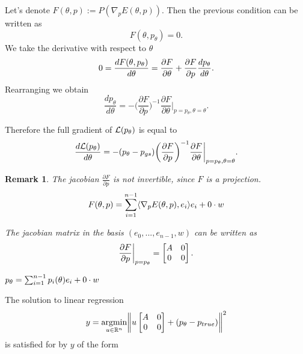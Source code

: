 \documentclass[a4paper,10pt]{report}
\newtheorem{remark}{Remark}
\begin{document}
Let's denote $F(\theta,p) :=P (\nabla_p E(\theta,p)).$ Then the previous condition can be written as
\begin{equation}
 F(\theta,p_\theta) = 0.
\end{equation}
We take the derivative with respect to $\theta$
\begin{equation}
0=\frac{dF(\theta, p_\theta)}{d \theta} = \frac{\partial F}{\partial \theta} + \frac{\partial F}{\partial p} \frac{dp_\theta}{d \theta}.
\end{equation}
Rearranging we obtain
\begin{equation}
 \frac{d p_\theta}{d\theta} = - \bigg(\frac{\partial F}{\partial p}\bigg)^{-1}  \frac{\partial F}{\partial \theta}\bigg|_{p=p_\theta, \theta=\theta}.
\end{equation}

Therefore the full gradient of $\mathcal{L}(p_\theta)$ is equal to
\begin{equation}
 \frac{d\mathcal{L}(p_\theta)}{d \theta} = - (p_\theta - p_{gs})\bigg(\frac{\partial F}{\partial p}\bigg)^{-1}  \frac{\partial F}{\partial \theta}\bigg|_{p=p_\theta, \theta=\theta}.
\end{equation}
\begin{remark}
 The jacobian $\frac{\partial F}{\partial p}$ is not invertible, since $F$ is a projection.
 \begin{equation}
  F(\theta, p) = \sum_{i=1}^{n-1} \langle \nabla_p E(\theta, p), e_i \rangle e_i +  0 \cdot w
 \end{equation}

 The jacobian matrix in the basis $(e_0,...,e_{n-1},w)$ can be written as \begin{equation}
                      \frac{\partial F}{\partial p}\bigg|_{p=p_\theta} =\begin{bmatrix}
A & 0 \\
0 & 0
\end{bmatrix}.
                     \end{equation}



 $p_\theta = \sum_{i=1}^{n-1}p_i(\theta) e_i +  0 \cdot w$
\end{remark}

The solution to linear regression
\begin{equation}
 y = \underset{u\in \mathbb{R}^n}{\mathrm{argmin }}\bigg\|u \begin{bmatrix}
A & 0 \\
0 & 0
\end{bmatrix} + (p_\theta-p_{true})\bigg\|^2
\end{equation}
is satisfied for by $y$ of the form
\end{document}
